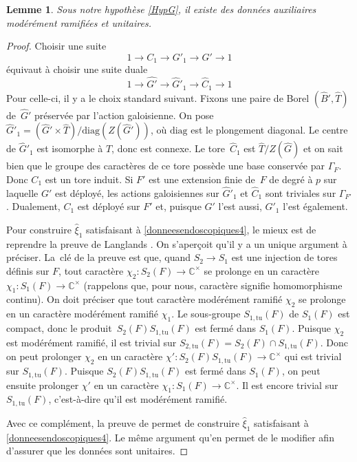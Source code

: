 \documentclass[11pt]{article}
\numberwithin{equation}{section}\providecommand{\og}{«\,}\providecommand{\fg}{\,»}
\newcommand{\diag}{\mathrm{diag}}
\newcommand{\tu}{\mathrm{tu}}
\newcommand{\CC}{\mathbb{C}}
\theoremstyle{plain}
\newtheorem*{lem*}{Lemme}
\theoremstyle{definition}
\begin{document}
\begin{lem*}
Sous notre hypothèse \ref{HypG}, il existe des données auxiliaires modérément ramifiées et unitaires.
\end{lem*}

\begin{proof}
Choisir une suite
\[
1\to C_{1}\to G'_{1}\to G'\to 1
\]
équivaut à choisir une suite duale
\[
1\to \hat{G'}\to \hat{G}'_{1}\to \hat{C}_{1}\to 1
\]
Pour celle-ci, il y a le choix standard suivant. Fixons une paire de Borel $(\hat{B}',\hat{T})$ de~$\hat{G}'$ préservée par l'action galoisienne. On pose $\hat{G}'_{1}=(\hat{G}'\times \hat{T})/\diag(Z(\hat{G}'))$, où $\diag$ est le plongement diagonal. Le centre de $\hat{G}'_{1}$ est isomorphe à $\hat{T}$, donc est connexe. Le tore~$\hat{C}_{1}$ est $\hat{T}/Z(\hat{G})$ et on sait bien que le groupe des caractères de ce tore possède une base conservée par $\Gamma_{F}$. Donc $C_{1}$ est un tore induit. Si $F'$ est une extension finie de~$F$ de degré à $p$ sur laquelle $G'$ est déployé, les actions galoisiennes sur $\hat{G}'_{1}$ et $\hat{C}_{1}$ sont triviales sur $\Gamma_{F'}$. Dualement, $C_{1}$ est déployé sur $F'$ et, puisque $G'$ l'est aussi, $G'_{1}$ l'est également.

Pour construire $\hat{\xi}_{1}$ satisfaisant à \eqref{donneesendoscopiques4}, le mieux est de reprendre la preuve de Langlands \cite[Lem.\,4]{L}. On s'aperçoit qu'il y a un unique argument à préciser. La~clé de la preuve est que, quand $S_{2}\to S_{1}$ est une injection de tores définis sur $F$, tout caractère $\chi_{2}:S_{2}(F)\to \CC^{\times}$ se prolonge en un caractère $\chi_{1}:S_{1}(F)\to \CC^{\times}$ (rappelons que, pour nous, caractère signifie homomorphisme continu). On doit préciser que tout caractère modé\-rément ramifié $\chi_{2}$ se prolonge en un caractère modérément ramifié $\chi_{1}$. Le sous-groupe $S_{1,\tu}(F)$ de $S_{1}(F)$ est compact, donc le produit~$S_{2}(F)S_{1,\tu}(F)$ est fermé dans $S_{1}(F)$. Puisque $\chi_{2}$ est modérément ramifié, il est trivial sur $S_{2,\tu}(F)=S_{2}(F)\cap S_{1,\tu}(F)$. Donc on peut prolonger $\chi_{2}$ en un caractère $\chi':S_{2}(F)S_{1,\tu}(F)\to \CC^{\times}$ qui est trivial sur $S_{1,\tu}(F)$. Puisque $S_{2}(F)S_{1,\tu}(F)$ est fermé dans $S_{1}(F)$, on peut ensuite prolonger $\chi'$ en un caractère $\chi_{1}:S_{1}(F)\to \CC^{\times}$. Il est encore trivial sur $S_{1,\tu}(F)$, c'est-à-dire qu'il est modérément ramifié.

Avec ce complément, la preuve de \cite{L} permet de construire $\hat{\xi}_{1}$ satisfaisant à \eqref{donneesendoscopiques4}. Le même argument qu'en \cite[I.7.1(3)]{MW} permet de le modifier afin d'assurer que les données sont unitaires.
\end{proof}
\end{document}
